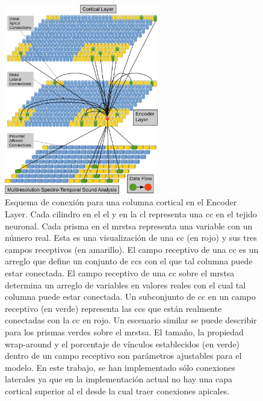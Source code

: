 \begin{figure}[h!]
    \centering
    \includegraphics[width=0.6\textwidth]{EncoderColumnConnections.png}
    \caption{Esquema de conexión para una columna cortical en el Encoder Layer.
    Cada cilindro en el \gls{el} y en la \gls{cl} representa una \gls{cc} en el tejido neuronal.
    Cada prisma en el \gls{mrstsa} representa una variable con un número real.
    Esta es una visualización de una \gls{cc} (en rojo) y sus tres campos receptivos (en amarillo).
    El campo receptivo de una \gls{cc} es un arreglo que define un conjunto de \glspl{cc}
    con el que tal columna puede estar conectada.
    El campo receptivo de una \gls{cc} sobre el \gls{mrstsa} determina un arreglo de variables en valores reales
    con el cual tal columna puede estar conectada.
    Un subconjunto de \gls{cc} en un campo receptivo (en verde) representa las \glspl{cc} que están realmente
    conectadas con la \gls{cc} en rojo. Un escenario similar se puede describir para los prismas verdes sobre
    el \gls{mrstsa}.
    El tamaño, la propiedad wrap-around y el porcentaje de vínculos establecidos (en verde) dentro de un campo receptivo son parámetros ajustables para el modelo.
    En este trabajo, se han implementado sólo conexiones laterales ya que en la implementación actual no hay una capa cortical superior al \gls{el} desde la cual
    traer conexiones apicales.}

\end{figure}
